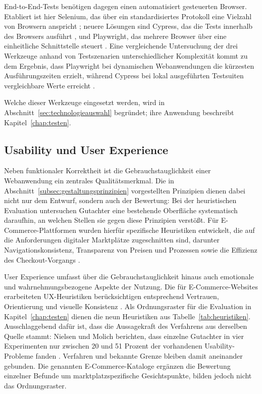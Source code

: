 End-to-End-Tests benötigen dagegen einen automatisiert gesteuerten
Browser. Etabliert ist hier Selenium, das über ein standardisiertes
Protokoll eine Vielzahl von Browsern anspricht \cite{selenium_docs};
neuere Lösungen sind Cypress, das die Tests innerhalb des Browsers
ausführt \cite{cypress_docs}, und Playwright, das mehrere Browser über
eine einheitliche Schnittstelle steuert \cite{playwright_docs}. Eine
vergleichende Untersuchung der drei Werkzeuge anhand von
Testszenarien unterschiedlicher Komplexität kommt zu dem Ergebnis,
dass Playwright bei dynamischen Webanwendungen die kürzesten
Ausführungszeiten erzielt, während Cypress bei lokal ausgeführten
Testsuiten vergleichbare Werte erreicht
\cite{tymoshchuk_test_automation}.

Welche dieser Werkzeuge eingesetzt werden, wird in
Abschnitt~\ref{sec:technologieauswahl} begründet; ihre Anwendung
beschreibt Kapitel~\ref{chap:testen}.



\subsection{Usability und User Experience}
\label{subsec:usability}

Neben funktionaler Korrektheit ist die Gebrauchstauglichkeit einer
Webanwendung ein zentrales Qualitätsmerkmal. Die in
Abschnitt~\ref{subsec:gestaltungsprinzipien} vorgestellten
Prinzipien dienen dabei nicht nur dem Entwurf, sondern auch der
Bewertung: Bei der heuristischen Evaluation untersuchen Gutachter
eine bestehende Oberfläche systematisch daraufhin, an welchen
Stellen sie gegen diese Prinzipien verstößt. Für
E-Commerce-Plattformen wurden hierfür spezifische Heuristiken
entwickelt, die auf die Anforderungen digitaler Marktplätze
zugeschnitten sind, darunter Navigationskonsistenz, Transparenz von
Preisen und Prozessen sowie die Effizienz des Checkout-Vorgangs
\cite{abdulaziz_heuristic_marketplace}.

User Experience umfasst über die Gebrauchstauglichkeit hinaus auch
emotionale und wahrnehmungsbezogene Aspekte der Nutzung. Die für
E-Commerce-Websites erarbeiteten \acs{UX}-Heuristiken berücksichtigen
entsprechend Vertrauen, Orientierung und visuelle Konsistenz
\cite{bonastre_ux_heuristics}. Als Ordnungsraster für die Evaluation in Kapitel~\ref{chap:testen}
dienen die neun Heuristiken aus Tabelle~\ref{tab:heuristiken}.
Ausschlaggebend dafür ist, dass die Aussagekraft des Verfahrens aus
derselben Quelle stammt: Nielsen und Molich berichten, dass einzelne
Gutachter in vier Experimenten nur zwischen 20 und 51 Prozent der
vorhandenen Usability-Probleme fanden
\cite{nielsen_molich_heuristic}. Verfahren und bekannte Grenze
bleiben damit aneinander gebunden. Die genannten
E-Commerce-Kataloge ergänzen die Bewertung einzelner Befunde um
marktplatzspezifische Gesichtspunkte, bilden jedoch nicht das
Ordnungsraster.
